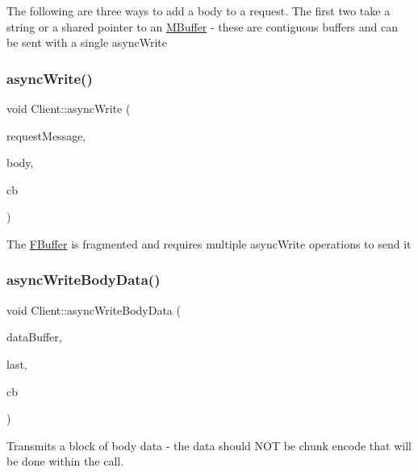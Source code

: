 The following are three ways to add a body to a request. The first two take a string or a shared pointer to an \hyperlink{struct_m_buffer}{M\+Buffer} -\/ these are contiguous buffers and can be sent with a single async\+Write \mbox{\label{class_client_aecccd1b8c74dc9c0df4e211a0625391b}} 
\subsubsection{\texorpdfstring{async\+Write()}{asyncWrite()}\hspace{0.1cm}{\footnotesize\ttfamily [3/3]}}
{\footnotesize\ttfamily void Client\+::async\+Write (\begin{DoxyParamCaption}\item[{Message\+Base\+S\+Ptr}]{request\+Message,  }\item[{F\+Buffer\+Shared\+Ptr}]{body,  }\item[{Response\+Handler\+Callback\+Type}]{cb }\end{DoxyParamCaption})}

The \hyperlink{class_f_buffer}{F\+Buffer} is fragmented and requires multiple async\+Write operations to send it \mbox{\label{class_client_a250fc2560b361f3fa3ef4a20061089d9}} 
\subsubsection{\texorpdfstring{async\+Write\+Body\+Data()}{asyncWriteBodyData()}}
{\footnotesize\ttfamily void Client\+::async\+Write\+Body\+Data (\begin{DoxyParamCaption}\item[{void $\ast$}]{data\+Buffer,  }\item[{bool}]{last,  }\item[{Write\+Body\+Data\+Callback\+Type}]{cb }\end{DoxyParamCaption})}

Transmits a block of body data -\/ the data should N\+OT be chunk encode that will be done within the call.


